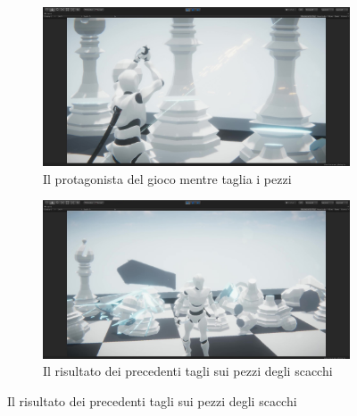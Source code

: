 \documentclass[12pt]{report}
\begin{document}
\begin{figure}[H]
  \centering
  \begin{subfigure}[b]{0.45\linewidth}
    \centering
    \includegraphics[width=\linewidth]{img/chess-game_Moment.jpg}
    \captionsetup{justification=centering}
    \caption{Il protagonista del gioco mentre taglia i pezzi}
  \end{subfigure}
   \begin{subfigure}[b]{0.45\linewidth}
    \centering
    \includegraphics[width=\linewidth]{img/chess-game_cutted.jpg}
    \captionsetup{justification=centering}
    \caption{Il risultato dei precedenti tagli sui pezzi degli scacchi}
  \end{subfigure}
\end{figure}
\end{document}
